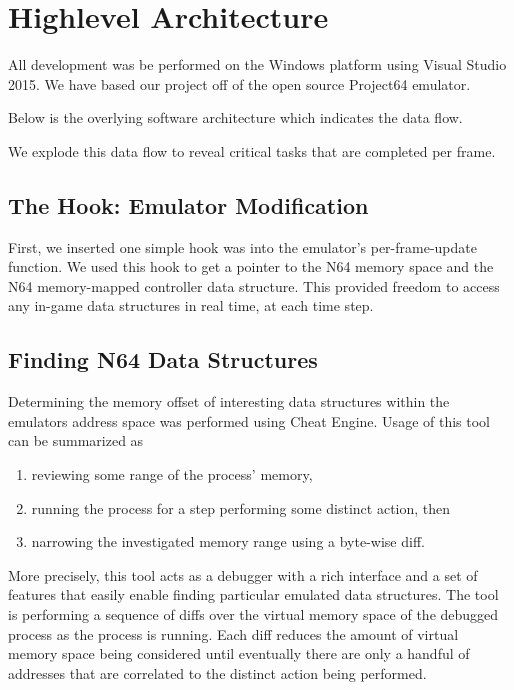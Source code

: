 \chapter*{Highlevel Architecture}

All development was be performed on the Windows platform using Visual Studio 2015.
We have based our project off of the open source Project64 emulator.

Below is the overlying software architecture which indicates the data flow.


We explode this data flow to reveal critical tasks that are completed per frame.


\section*{The Hook: Emulator Modification}
First, we inserted one simple hook was into the emulator's per-frame-update function. 
We used this hook to get a pointer to the N64 memory space and the N64 memory-mapped controller data structure.
This provided freedom to access any in-game data structures in real time, at each time step. 

\section*{Finding N64 Data Structures}
Determining the memory offset of interesting data structures within the emulators address space was performed using Cheat Engine.
Usage of this tool can be summarized as 
\begin{enumerate}
\item reviewing some range of the process' memory,
\item  running the process for a step performing some distinct action, then
\item narrowing the investigated memory range using a byte-wise diff.
\end{enumerate}

More precisely, this tool acts as a debugger with a rich interface and a set of features that easily enable finding particular emulated data structures.
The tool is performing a sequence of diffs over the virtual memory space of the debugged process as the process is running.
Each diff reduces the amount of virtual memory space being considered until eventually there are only a handful of addresses that are correlated to the distinct action being performed.

